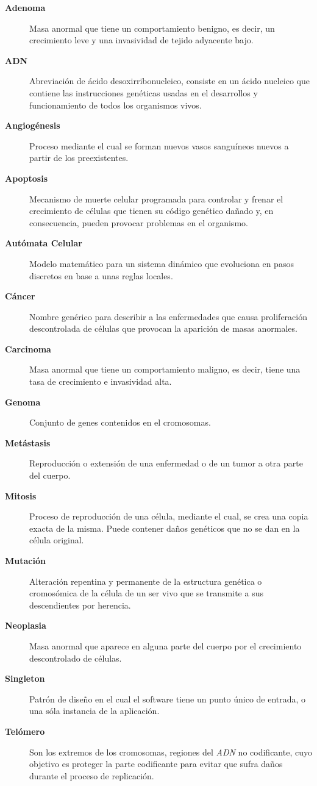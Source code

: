 \begin{description}
    \item[\textbf{Adenoma}] Masa anormal que tiene un comportamiento benigno, es decir, un crecimiento leve y una invasividad de tejido adyacente bajo.
    \item[\textbf{ADN}] Abreviación de ácido desoxirribonucleico, consiste en un ácido nucleico que contiene las instrucciones genéticas usadas en el desarrollos y funcionamiento de todos los organismos vivos.
    \item[\textbf{Angiogénesis}] Proceso mediante el cual se forman nuevos vasos sanguíneos nuevos a partir de los preexistentes.
    \item[\textbf{Apoptosis}] Mecanismo de muerte celular programada para controlar y frenar el crecimiento de células que tienen su código genético dañado y, en consecuencia, pueden provocar problemas en el organismo.
    \item[\textbf{Autómata Celular}] Modelo matemático para un sistema dinámico que evoluciona en pasos discretos en base a unas reglas locales.
    \item[\textbf{Cáncer}] Nombre genérico para describir a las enfermedades que causa proliferación descontrolada de células que provocan la aparición de masas anormales.
    \item[\textbf{Carcinoma}] Masa anormal que tiene un comportamiento maligno, es decir, tiene una tasa de crecimiento e invasividad alta.
    \item[\textbf{Genoma}] Conjunto de genes contenidos en el cromosomas.
    \item[\textbf{Metástasis}] Reproducción o extensión de una enfermedad o de un tumor a otra parte del cuerpo.
    \item[\textbf{Mitosis}] Proceso de reproducción de una célula, mediante el cual, se crea una copia exacta de la misma. Puede contener daños genéticos que no se dan en la célula original.
    \item[\textbf{Mutación}] Alteración repentina y permanente de la estructura genética o cromosómica de la célula de un ser vivo que se transmite a sus descendientes por herencia.
    \item[\textbf{Neoplasia}] Masa anormal que aparece en alguna parte del cuerpo por el crecimiento descontrolado de células.
    \item[\textbf{Singleton}] Patrón de diseño en el cual el software tiene un punto único de entrada, o una sóla instancia de la aplicación.
    \item[\textbf{Telómero}] Son los extremos de los cromosomas, regiones del \textit{ADN} no codificante, cuyo objetivo es proteger la parte codificante para evitar que sufra daños durante el proceso de replicación.
\end{description}
